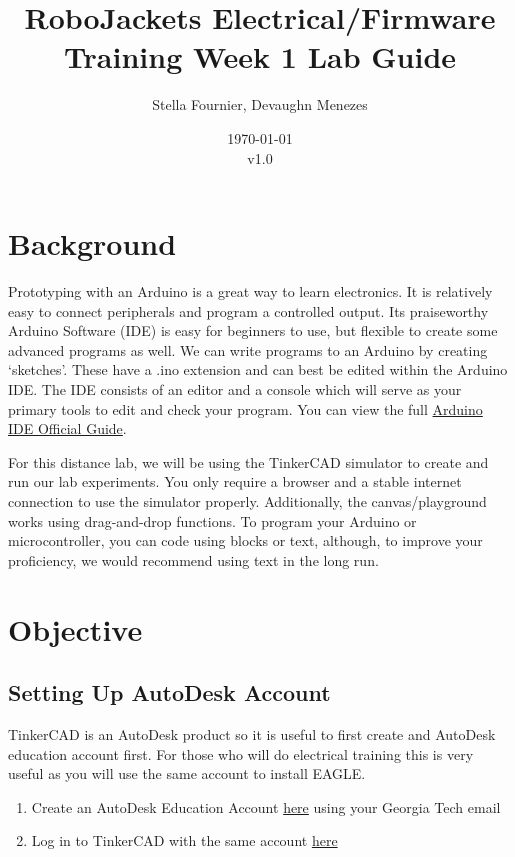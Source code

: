 \documentclass{article}
\title{RoboJackets Electrical/Firmware Training Week 1 Lab Guide}
\author{Stella Fournier, Devaughn Menezes}
\date{\today\\v1.0}
\begin{document}
\maketitle{}
\setcounter{tocdepth}{2}
\tableofcontents
\pagebreak


\section{Background}
Prototyping with an Arduino is a great way to learn electronics. It is relatively easy to connect peripherals and program a controlled output. Its praiseworthy Arduino Software (IDE) is easy for beginners to use, but flexible to create some advanced programs as well. 
We can write programs to an Arduino by creating ‘sketches’. These have a .ino extension and can best be edited within the Arduino IDE. The IDE consists of an editor and a console which will serve as your primary tools to edit and check your program. You can view the full \href{https://www.arduino.cc/en/Guide/Environment}{Arduino IDE Official Guide}.

For this distance lab, we will be using the TinkerCAD simulator to create and run our lab experiments. You only require a browser and a stable internet connection to use the simulator properly. Additionally, the canvas/playground works using drag-and-drop functions. To program your Arduino or microcontroller, you can code using blocks or text, although, to improve your proficiency, we would recommend using text in the long run.


\section{Objective}
\subsection{Setting Up AutoDesk Account}
TinkerCAD is an AutoDesk product so it is useful to first create and AutoDesk education account first. For those who will do electrical training this is very useful as you will use the same account to install EAGLE.
\begin{enumerate}
    \item Create an AutoDesk Education Account \href{https://www.autodesk.com/education/edu-software/overview}{here} using your Georgia Tech email
    \item Log in to TinkerCAD with the same account \href{https://www.tinkercad.com/login}{here}
\end{enumerate}
\end{document}
